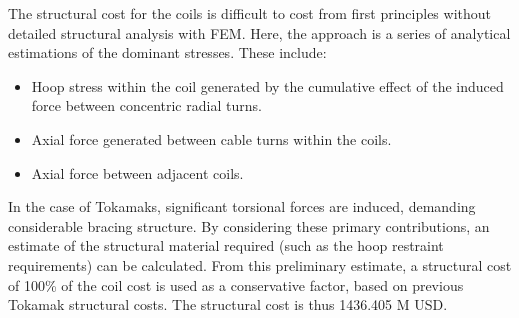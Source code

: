 The structural cost for the coils is difficult to cost from first principles without detailed structural analysis with FEM. Here, the approach is a series of analytical estimations of the dominant stresses. These include:

\begin{itemize}
    \item Hoop stress within the coil generated by the cumulative effect of the induced force between concentric radial turns.
    \item Axial force generated between cable turns within the coils. 
    \item Axial force between adjacent coils.
\end{itemize}


In the case of Tokamaks, significant torsional forces are induced, demanding considerable bracing structure. By considering these primary contributions, an estimate of the structural material required (such as the hoop restraint requirements) can be calculated. From this preliminary estimate, a structural cost of 100\% of the coil cost is used as a conservative factor, based on previous Tokamak structural costs. The structural cost is thus 1436.405 M USD.



